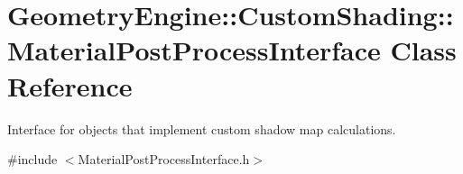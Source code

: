 \hypertarget{class_geometry_engine_1_1_custom_shading_1_1_material_post_process_interface}{}\section{Geometry\+Engine\+::Custom\+Shading\+::Material\+Post\+Process\+Interface Class Reference}
\label{class_geometry_engine_1_1_custom_shading_1_1_material_post_process_interface}


Interface for objects that implement custom shadow map calculations.  




{\ttfamily \#include $<$Material\+Post\+Process\+Interface.\+h$>$}

